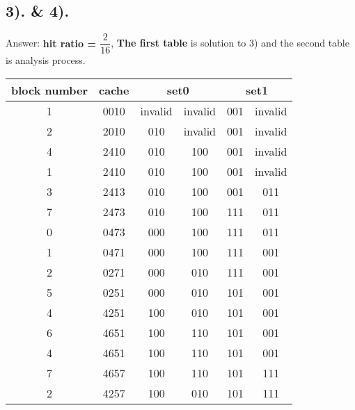 \documentclass[11pt]{article}  %
\begin{document}
\subsection*{3). \& 4). }
Answer: 
\textbf{hit ratio = $\dfrac{2 }{16}$}, \textbf{The first table} is solution to 3) and the second table is analysis process.
\begin{table}[H]
    \centering
    \begin{tabular}{|c|c|cc|cc|}
    \hline
    block number & cache & \multicolumn{2}{c|}{set0}              & \multicolumn{2}{c|}{set1}          \\ \hline
    1            & 0010  & \multicolumn{1}{c|}{invalid} & invalid & \multicolumn{1}{c|}{001} & invalid \\ \hline
    2            & 2010  & \multicolumn{1}{c|}{010}     & invalid & \multicolumn{1}{c|}{001} & invalid \\ \hline
    4            & 2410  & \multicolumn{1}{c|}{010}     & 100     & \multicolumn{1}{c|}{001} & invalid \\ \hline
    1            & 2410  & \multicolumn{1}{c|}{010}     & 100     & \multicolumn{1}{c|}{001} & invalid \\ \hline
    3            & 2413  & \multicolumn{1}{c|}{010}     & 100     & \multicolumn{1}{c|}{001} & 011     \\ \hline
    7            & 2473  & \multicolumn{1}{c|}{010}     & 100     & \multicolumn{1}{c|}{111} & 011     \\ \hline
    0            & 0473  & \multicolumn{1}{c|}{000}     & 100     & \multicolumn{1}{c|}{111} & 011     \\ \hline
    1            & 0471  & \multicolumn{1}{c|}{000}     & 100     & \multicolumn{1}{c|}{111} & 001     \\ \hline
    2            & 0271  & \multicolumn{1}{c|}{000}     & 010     & \multicolumn{1}{c|}{111} & 001     \\ \hline
    5            & 0251  & \multicolumn{1}{c|}{000}     & 010     & \multicolumn{1}{c|}{101} & 001     \\ \hline
    4            & 4251  & \multicolumn{1}{c|}{100}     & 010     & \multicolumn{1}{c|}{101} & 001     \\ \hline
    6            & 4651  & \multicolumn{1}{c|}{100}     & 110     & \multicolumn{1}{c|}{101} & 001     \\ \hline
    4            & 4651  & \multicolumn{1}{c|}{100}     & 110     & \multicolumn{1}{c|}{101} & 001     \\ \hline
    7            & 4657  & \multicolumn{1}{c|}{100}     & 110     & \multicolumn{1}{c|}{101} & 111     \\ \hline
    2            & 4257  & \multicolumn{1}{c|}{100}     & 010     & \multicolumn{1}{c|}{101} & 111     \\ \hline
    \end{tabular}
\end{table}
\end{document}
